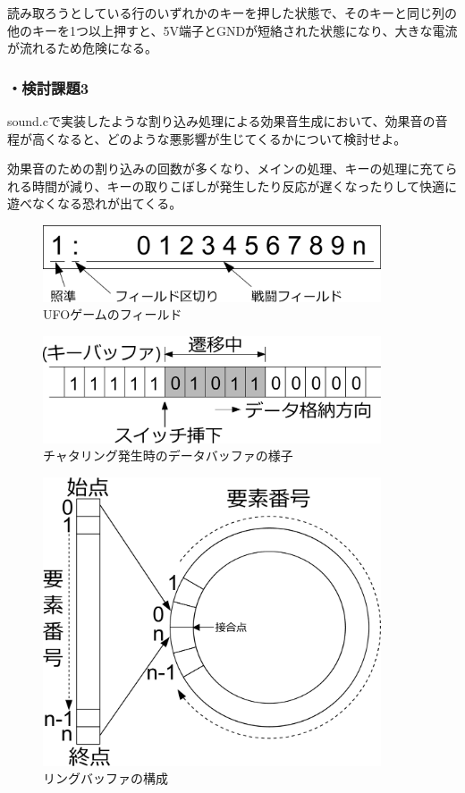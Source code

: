 ﻿\documentclass{jarticle}
\begin{document}
読み取ろうとしている行のいずれかのキーを押した状態で、そのキーと同じ列の他のキーを1つ以上押すと、5V端子とGNDが短絡された状態になり、大きな電流が流れるため危険になる。

\subsubsection*{・検討課題3}
sound.cで実装したような割り込み処理による効果音生成において、効果音の音程が高くなると、どのような悪影響が生じてくるかについて検討せよ。


効果音のための割り込みの回数が多くなり、メインの処理、キーの処理に充てられる時間が減り、キーの取りこぼしが発生したり反応が遅くなったりして快適に遊べなくなる恐れが出てくる。

\newpage

\begin{figure}[h]
	\begin{center}
		\includegraphics[width=10cm]{./figure1.eps}
	\end{center}
	\caption{UFOゲームのフィールド}
\end{figure}

\begin{figure}[h]
	\begin{center}
		\includegraphics[width=10cm]{./figure2.eps}
	\end{center}
	\caption{チャタリング発生時のデータバッファの様子}
\end{figure}

\begin{figure}[!h]
	\begin{center}
		\includegraphics[width=10cm]{./figure3.eps}
	\end{center}
	\caption{リングバッファの構成}
\end{figure}
\end{document}
